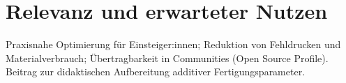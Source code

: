 \chapter{Relevanz und erwarteter Nutzen}
\label{cha:Relevanz und erwarteter Nutzen}

Praxisnahe Optimierung für Einsteiger:innen; Reduktion von Fehldrucken und Materialverbrauch; Übertragbarkeit in Communities (Open Source Profile). Beitrag zur didaktischen Aufbereitung additiver Fertigungsparameter.